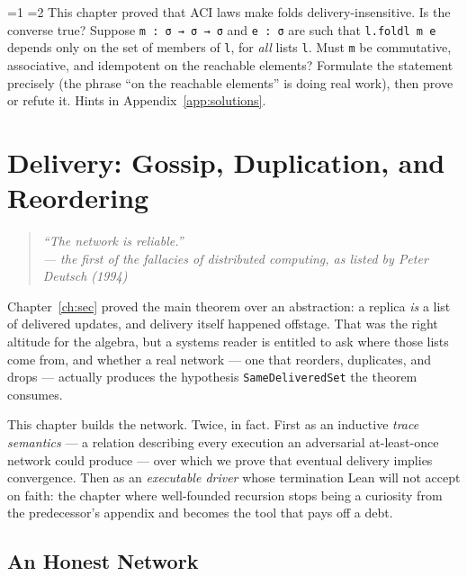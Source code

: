 \documentclass[12pt, a4paper, openright]{book}
\theoremstyle{thmstyle}
\theoremstyle{defstyle}
\newcommand{\lc}[1]{\texttt{#1}}
\newcounter{exercise}[chapter]
\renewcommand{\theexercise}{\thechapter.\arabic{exercise}}
\newenvironment{exercisebox}[1][]{%
  \refstepcounter{exercise}%
  \begin{tcolorbox}[exercisebox,
    title={Exercise \theexercise\ifx\\#1\\\else\ --- #1\fi}]%
}{\end{tcolorbox}}
\newcommand{\Stars}[1]{%
  \ifnum#1=1 \ding{72}\else\ifnum#1=2 \ding{72}\ding{72}\else
  \ding{72}\ding{72}\ding{72}\fi\fi\enspace}
\begin{document}
\begin{exercisebox}[The converse question]
  \label{ex:aci-converse}
  \Stars{3}
  This chapter proved that ACI laws make folds delivery-insensitive. Is
  the converse true? Suppose \lc{m : σ → σ → σ} and \lc{e : σ} are such
  that \lc{l.foldl m e} depends only on the set of members of \lc{l},
  for \emph{all} lists \lc{l}. Must \lc{m} be commutative, associative,
  and idempotent on the reachable elements? Formulate the statement
  precisely (the phrase ``on the reachable elements'' is doing real
  work), then prove or refute it. Hints in
  Appendix~\ref{app:solutions}.
\end{exercisebox}

\chapter{Delivery: Gossip, Duplication, and Reordering}
\label{ch:delivery}

\begin{quote}
  \itshape
  ``The network is reliable.''\\
  --- the first of the fallacies of distributed computing, as listed
  by Peter Deutsch (1994)
\end{quote}

Chapter~\ref{ch:sec} proved the main theorem over an abstraction: a
replica \emph{is} a list of delivered updates, and delivery itself
happened offstage. That was the right altitude for the algebra, but a
systems reader is entitled to ask where those lists come from, and
whether a real network --- one that reorders, duplicates, and drops ---
actually produces the hypothesis \lc{SameDeliveredSet} the theorem
consumes.

This chapter builds the network. Twice, in fact. First as an inductive
\emph{trace semantics} --- a relation describing every execution an
adversarial at-least-once network could produce --- over which we prove
that eventual delivery implies convergence. Then as an \emph{executable
driver} whose termination Lean will not accept on faith: the chapter
where well-founded recursion stops being a curiosity from the
predecessor's appendix and becomes the tool that pays off a debt.

\section{An Honest Network}
\end{document}
